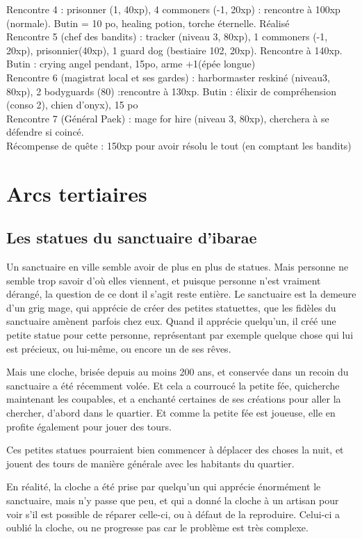 \documentclass[10pt,a4paper]{book}
\begin{document}
Rencontre 4 : prisonner (1, 40xp), 4 commoners (-1, 20xp) : rencontre à 100xp (normale). Butin  = 10 po, healing potion, torche éternelle. Réalisé\\
Rencontre 5 (chef des bandits) : tracker (niveau 3, 80xp), 1 commoners (-1, 20xp), prisonnier(40xp), 1 guard dog (bestiaire 102, 20xp). Rencontre à 140xp. Butin : crying angel pendant, 15po, arme +1(épée longue)\\
Rencontre 6 (magistrat local et ses gardes) : harbormaster reskiné (niveau3, 80xp), 2 bodyguards (80) :rencontre à 130xp. Butin : élixir de compréhension (conso 2), chien d'onyx), 15 po\\
Rencontre 7 (Général Paek) : mage for hire (niveau 3, 80xp), cherchera à se défendre si coincé. \\

Récompense de quête : 150xp pour avoir résolu le tout (en comptant les bandits)
\section{Arcs tertiaires}
\subsection{Les statues du sanctuaire d'ibarae}
Un sanctuaire en ville semble avoir de plus en plus de statues. Mais personne ne semble trop savoir d'où elles viennent, et puisque personne n'est vraiment dérangé, la question de ce dont il s'agit reste entière. Le sanctuaire est la demeure d'un grig mage, qui apprécie de créer des petites statuettes, que les fidèles du sanctuaire amènent parfois chez eux. Quand il apprécie quelqu'un, il créé une petite statue pour cette personne, représentant par exemple quelque chose qui lui est précieux, ou lui-même, ou encore un de ses rêves.

Mais une cloche, brisée depuis au moins 200 ans, et conservée dans un recoin du sanctuaire a été récemment volée. Et cela a courroucé la petite fée, quicherche maintenant les coupables, et a enchanté certaines de ses créations pour aller la chercher, d'abord dans le quartier. Et comme la petite fée est joueuse, elle en profite également pour jouer des tours.

Ces petites statues pourraient bien commencer à déplacer des choses la nuit, et jouent des tours de manière générale avec les habitants du quartier.

En réalité, la cloche a été prise par quelqu'un qui apprécie énormément le sanctuaire, mais n'y passe que peu, et qui a donné la cloche à un artisan pour voir s'il est possible de réparer celle-ci, ou à défaut de la reproduire. Celui-ci a oublié la cloche, ou ne progresse pas car le problème est très complexe.
\end{document}
